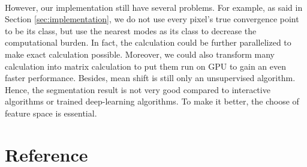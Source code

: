 \documentclass{gapd}
\begin{document}
\paragraph{} 
	However, our implementation still have several problems. For example, as said in Section \ref{sec:implementation}, we do not use every pixel's true convergence point to be its class, but use the nearest modes as its class to decrease the computational burden. In fact, the calculation could be further parallelized to make exact calculation possible. Moreover, we could also transform many calculation into matrix calculation to put them run on GPU to gain an even faster performance. Besides, mean shift is still only an unsupervised algorithm. Hence, the segmentation result is not very good compared to interactive algorithms or trained deep-learning algorithms. To make it better, the choose of feature space is essential. 
			

\section{Reference}

\end{document}
